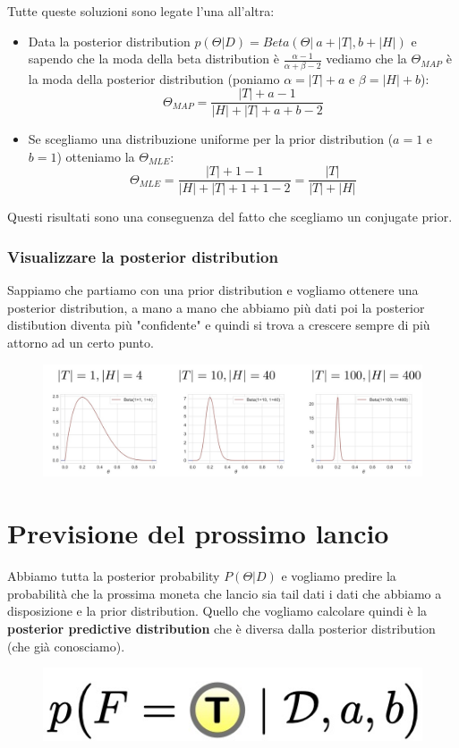\documentclass[14pt]{extreport}
\begin{document}
Tutte queste soluzioni sono legate l'una all'altra:
\begin{itemize}
\item Data la posterior distribution $p(\Theta|D) = Beta(\Theta|\ a+|T|, b+|H|)$ e sapendo che la moda della beta distribution è $\frac{\alpha -1
}{\alpha + \beta - 2}$ vediamo che la $\Theta_{MAP}$ è la moda della posterior distribution (poniamo $\alpha=|T|+a$ e $\beta=|H|+b$):
$$\Theta_{MAP}=\frac{|T|+a-1}{|H|+|T|+a+b-2}$$
\item Se scegliamo una distribuzione uniforme per la prior distribution ($a=1$ e $b=1$) otteniamo la $\Theta_{MLE}$:
$$\Theta_{MLE}=\frac{|T|+1-1}{|H|+|T|+1+1-2} = \frac{|T|}{|T|+|H|}$$
\end{itemize}
Questi risultati sono una conseguenza del fatto che scegliamo un conjugate prior.

\subsubsection{Visualizzare la posterior distribution}

Sappiamo che partiamo con una prior distribution e vogliamo ottenere una posterior distribution, a mano a mano che abbiamo più dati poi la posterior
distibution diventa più "confidente" e quindi si trova a crescere sempre di più attorno ad un certo punto.
\begin{figure}[H]
\centering
\includegraphics[width=0.7\linewidth]{47.jpeg}
\end{figure}


\section{Previsione del prossimo lancio}

Abbiamo tutta la posterior probability $P(\Theta | D)$ e vogliamo predire la probabilità che la prossima moneta che lancio sia tail dati i dati che
abbiamo a disposizione e la prior distribution. Quello che vogliamo calcolare quindi è la \textbf{posterior predictive distribution} che è diversa
dalla posterior distribution (che già conosciamo).
 
\begin{figure}[H]
\centering
\includegraphics[width=0.3\linewidth]{48.jpeg}
\end{figure}
\end{document}
